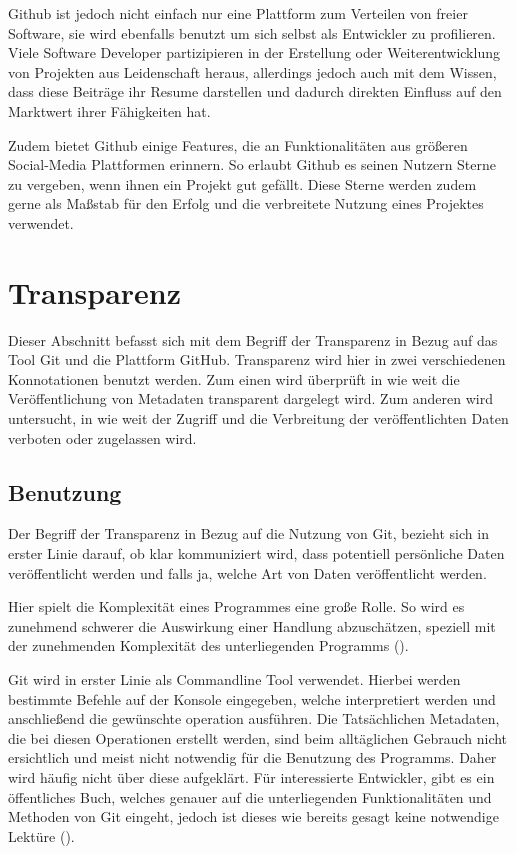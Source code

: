 \documentclass[12pt,a4paper]{article}
\begin{document}
Github ist jedoch nicht einfach nur eine Plattform zum Verteilen von freier Software, sie wird ebenfalls benutzt um sich selbst als Entwickler zu profilieren.
Viele Software Developer partizipieren in der Erstellung oder Weiterentwicklung von Projekten aus Leidenschaft heraus, allerdings jedoch auch mit dem Wissen, dass diese Beiträge ihr Resume darstellen und dadurch direkten Einfluss auf den Marktwert ihrer Fähigkeiten hat.

Zudem bietet Github einige Features, die an Funktionalitäten aus größeren Social-Media Plattformen erinnern.
So erlaubt Github es seinen Nutzern Sterne zu vergeben, wenn ihnen ein Projekt gut gefällt.
Diese Sterne werden zudem gerne als Maßstab für den Erfolg und die verbreitete Nutzung eines Projektes verwendet.

\section{Transparenz}

Dieser Abschnitt befasst sich mit dem Begriff der Transparenz in Bezug auf das Tool Git und die Plattform GitHub.
Transparenz wird hier in zwei verschiedenen Konnotationen benutzt werden.
Zum einen wird überprüft in wie weit die Veröffentlichung von Metadaten transparent dargelegt wird.
Zum anderen wird untersucht, in wie weit der Zugriff und die Verbreitung der veröffentlichten Daten verboten oder zugelassen wird.

\subsection{Benutzung}
Der Begriff der Transparenz in Bezug auf die Nutzung von Git, bezieht sich in erster Linie darauf, ob klar kommuniziert wird, dass potentiell persönliche Daten veröffentlicht werden und falls ja, welche Art von Daten veröffentlicht werden.

Hier spielt die Komplexität eines Programmes eine große Rolle.
So wird es zunehmend schwerer die Auswirkung einer Handlung abzuschätzen, speziell mit der zunehmenden Komplexität des unterliegenden Programms (\cite[p. 2]{article:dataethics}).

Git wird in erster Linie als Commandline Tool verwendet.
Hierbei werden bestimmte Befehle auf der Konsole eingegeben, welche interpretiert werden und anschließend die gewünschte operation ausführen.
Die Tatsächlichen Metadaten, die bei diesen Operationen erstellt werden, sind beim alltäglichen Gebrauch nicht ersichtlich und meist nicht notwendig für die Benutzung des Programms.
Daher wird häufig nicht über diese aufgeklärt.
Für interessierte Entwickler, gibt es ein öffentliches Buch, welches genauer auf die unterliegenden Funktionalitäten und Methoden von Git eingeht, jedoch ist dieses wie bereits gesagt keine notwendige Lektüre (\cite{book:pro-git}).
\end{document}

